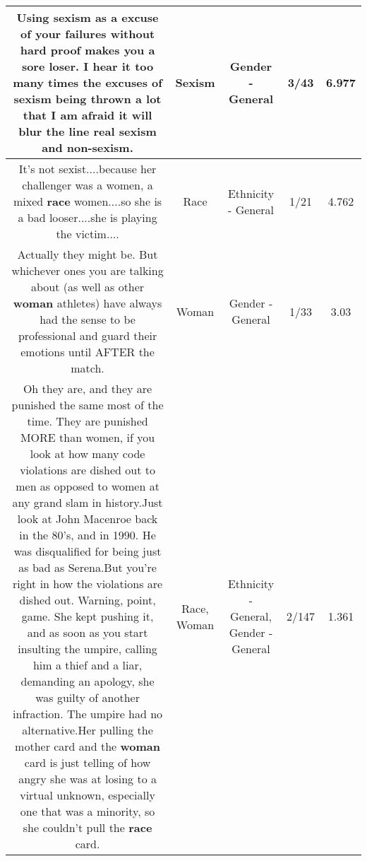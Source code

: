 \documentclass[11pt]{article}
\newlength\mylength
\begin{document}
\begin{center}
\begin{longtable}{|C{.65\mylength}|C{.30\mylength}|C{.12\mylength}|C{.12\mylength}|C{.12\mylength}|}
  \small Using \textbf{sexism} as a excuse of your failures without hard proof makes you  a sore loser. I hear it too many times the excuses of \textbf{sexism} being thrown a lot that I am afraid it will blur the line real \textbf{sexism} and non-\textbf{sexism}.\normalsize   & Sexism & Gender - General & 3/43 & 6.977 \\  \hline
  \small It's not sexist....because her challenger was a women, a mixed \textbf{race} women....so she is a bad looser....she is playing the victim....\normalsize   & Race & Ethnicity - General & 1/21 & 4.762 \\  \hline
  \small Actually they might be. But whichever ones you are talking about (as well as other \textbf{woman} athletes) have always had the sense to be professional and guard their emotions until AFTER the match.\normalsize   & Woman & Gender - General & 1/33 & 3.03 \\  \hline
  \small Oh they are, and they are punished the same most of the time. They are punished MORE than women, if you look at how many code violations are dished out to men as opposed to women at any grand slam in history.Just look at John Macenroe back in the 80's, and in 1990. He was disqualified for being just as bad as Serena.But you're right in how the violations are dished out. Warning, point, game. She kept pushing it, and as soon as you start insulting the umpire, calling him a thief and a liar, demanding an apology, she was guilty of another infraction. The umpire had no alternative.Her pulling the mother card and the \textbf{woman} card is just telling of how angry she was at losing to a virtual unknown, especially one that was a minority, so she couldn't pull the \textbf{race} card.\normalsize   & Race, Woman & Ethnicity - General, Gender - General & 2/147 & 1.361 \\  \hline

\end{longtable}
\end{center}
\end{document}
